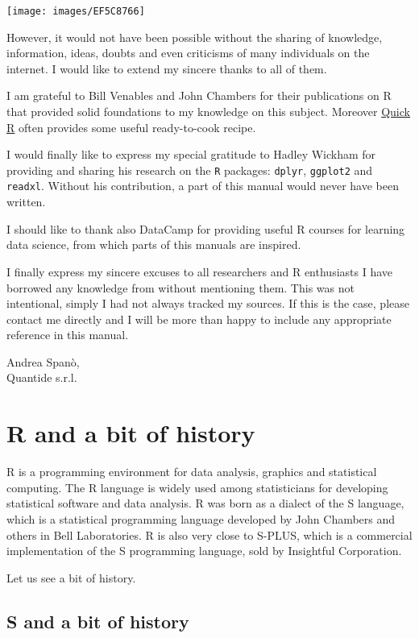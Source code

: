 \documentclass[]{book}
\begin{document}
\texttt{[image: images/EF5C8766]}

However, it would not have been possible without the sharing of
knowledge, information, ideas, doubts and even criticisms of many
individuals on the internet. I would like to extend my sincere thanks to
all of them.

I am grateful to Bill Venables and John Chambers for their publications
on R that provided solid foundations to my knowledge on this subject.
Moreover \href{http://www.statmethods.net/}{Quick R} often provides some
useful ready-to-cook recipe.

I would finally like to express my special gratitude to Hadley Wickham
for providing and sharing his research on the \texttt{R} packages:
\texttt{dplyr}, \texttt{ggplot2} and \texttt{readxl}. Without his
contribution, a part of this manual would never have been written.

I should like to thank also DataCamp for providing useful R courses for
learning data science, from which parts of this manuals are inspired.

I finally express my sincere excuses to all researchers and R
enthusiasts I have borrowed any knowledge from without mentioning them.
This was not intentional, simply I had not always tracked my sources. If
this is the case, please contact me directly and I will be more than
happy to include any appropriate reference in this manual.

Andrea Spanò,\\
Quantide s.r.l.

\chapter{R and a bit of history}\label{r-and-a-bit-of-history}

R is a programming environment for data analysis, graphics and
statistical computing. The R language is widely used among statisticians
for developing statistical software and data analysis. R was born as a
dialect of the S language, which is a statistical programming language
developed by John Chambers and others in Bell Laboratories. R is also
very close to S-PLUS, which is a commercial implementation of the S
programming language, sold by Insightful Corporation.

Let us see a bit of history.

\section{S and a bit of history}\label{s-and-a-bit-of-history}
\end{document}
